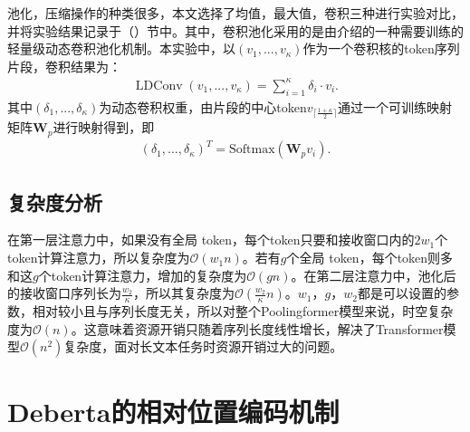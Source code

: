池化，压缩操作的种类很多，本文选择了均值，最大值，卷积三种进行实验对比，并将实验结果记录于（）节中。其中，卷积池化采用的是由\cite{wu2019pay}介绍的一种需要训练的轻量级动态卷积池化机制。本实验中，以$(v_1,...,v_\kappa)$作为一个卷积核的token序列片段，卷积结果为：
\begin{align}
\operatorname{LDConv}(v_1,...,v_\kappa)=\sum_{i=1}^{\kappa} \delta_{i} \cdot v_i .
\label{eq:LDConv}
\end{align}
其中$(\delta_1,...,\delta_\kappa)$为动态卷积权重，由片段的中心token$v_{\lceil \frac{1+\kappa}{2} \rceil}$通过一个可训练映射矩阵$\mathbf{W}_p$进行映射得到，即
\begin{align}
    (\delta_1, ..., \delta_\kappa)^T = \text{Softmax}(\mathbf{W}_p v_i).
\end{align}

\subsection{复杂度分析}

在第一层注意力中，如果没有全局 token，每个token只要和接收窗口内的$2w_1$个token计算注意力，所以复杂度为$\mathcal{O}(w_1n)$。若有$g$个全局 token，每个token则多和这$g$个token计算注意力，增加的复杂度为$\mathcal{O}(gn)$。在第二层注意力中，池化后的接收窗口序列长为$\frac{w_2}{\kappa}$，所以其复杂度为$\mathcal{O}(\frac{w_2}{\kappa}n)$。$w_1$，$g$，$w_2$都是可以设置的参数，相对较小且与序列长度无关，所以对整个Poolingformer模型来说，时空复杂度为$\mathcal{O}(n)$。这意味着资源开销只随着序列长度线性增长，解决了Transformer模型$\mathcal{O}(n^2)$复杂度，面对长文本任务时资源开销过大的问题。

\section{Deberta的相对位置编码机制}
\label{sec:deb}


